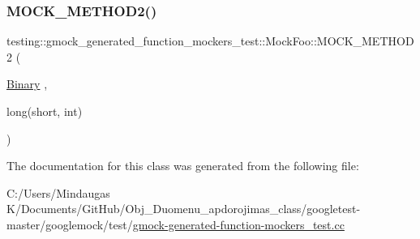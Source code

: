 \subsubsection{\texorpdfstring{MOCK\_METHOD2()}{MOCK\_METHOD2()}\hspace{0.1cm}{\footnotesize\ttfamily [3/3]}}
{\footnotesize\ttfamily testing\+::gmock\+\_\+generated\+\_\+function\+\_\+mockers\+\_\+test\+::\+Mock\+Foo\+::\+M\+O\+C\+K\+\_\+\+M\+E\+T\+H\+O\+D2 (\begin{DoxyParamCaption}\item[{\mbox{\hyperlink{classtesting_1_1gmock__generated__function__mockers__test_1_1_foo_interface_a59ea28b711ece054ce9d57c2dc574ba0}{Binary}}}]{,  }\item[{long(short, int)}]{ }\end{DoxyParamCaption})}



The documentation for this class was generated from the following file\+:\begin{DoxyCompactItemize}
\item 
C\+:/\+Users/\+Mindaugas K/\+Documents/\+Git\+Hub/\+Obj\+\_\+\+Duomenu\+\_\+apdorojimas\+\_\+class/googletest-\/master/googlemock/test/\mbox{\hyperlink{googletest-master_2googlemock_2test_2gmock-generated-function-mockers__test_8cc}{gmock-\/generated-\/function-\/mockers\+\_\+test.\+cc}}\end{DoxyCompactItemize}
